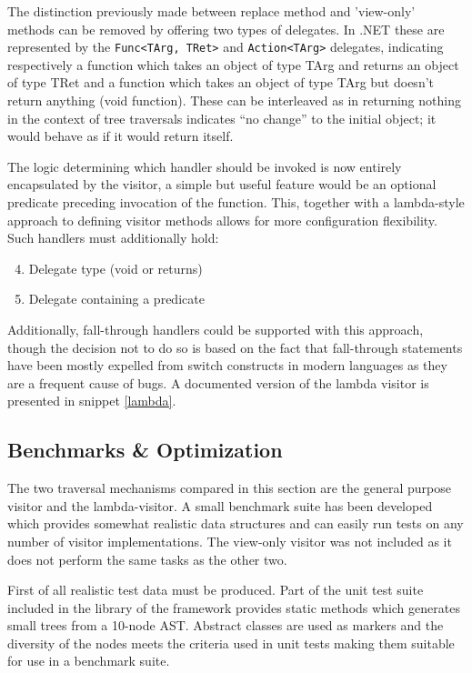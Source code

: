 \documentclass[twoside,openright]{uva-bachelor-thesis}
\newcommand{\code}[1]{\texttt{\footnotesize#1}}
\begin{document}
			The distinction previously made between replace method and 'view-only' methods can be removed by offering two types of delegates. In .NET these are represented by the \code{Func<TArg, TRet>} and \code{Action<TArg>}  delegates, indicating respectively a function which takes an object of type TArg and returns an object of type TRet and a function which takes an object of type TArg but doesn't return anything (void function). These can be interleaved as in returning nothing in the context of tree traversals indicates ``no change'' to the initial object; it would behave as if it would return itself.
			
			The logic determining which handler should be invoked is now entirely encapsulated by the visitor, a simple but useful feature would be an optional predicate preceding invocation of the function. This, together with a lambda-style approach to defining visitor methods allows for more configuration flexibility. Such handlers must additionally hold:
			\begin{enumerate}
				\setcounter{enumi}{3}
				\item Delegate type (void or returns)
				\item Delegate containing a predicate
			\end{enumerate}
						
			Additionally, fall-through handlers could be supported with this approach, though the decision not to do so is based on the fact that fall-through statements have been mostly expelled from switch constructs in modern languages as they are a frequent cause of bugs. A documented version of the lambda visitor is presented in snippet \ref{lambda}.
			
		\subsection{Benchmarks \& Optimization}
			The two traversal mechanisms compared in this section are the general purpose visitor and the lambda-visitor. A small benchmark suite has been developed which provides somewhat realistic data structures and can easily run tests on any number of visitor implementations. The view-only visitor was not included as it does not perform the same tasks as the other two.
			
			First of all realistic test data must be produced. Part of the unit test suite included in the library of the framework provides static methods which generates small trees from a 10-node AST. Abstract classes are used as markers and the diversity of the nodes meets the criteria used in unit tests making them suitable for use in a benchmark suite.
			
\end{document}
